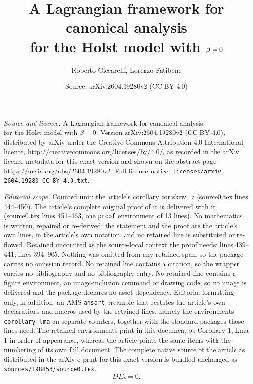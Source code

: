 \documentclass[10pt,a4paper]{amsart}
\title{A Lagrangian framework for canonical analysis \\ for the Holst model with $\be = 0$}
\author{Roberto Ciccarelli, Lorenzo Fatibene}
\date{Source: arXiv:2604.19280v2 (CC BY 4.0)}
\def\be{\beta}
\begin{document}
\maketitle

\noindent\emph{Source and licence.} A Lagrangian framework for canonical analysis \\ for the Holst model with $\be = 0$. Version arXiv:2604.19280v2 (CC BY 4.0), distributed by arXiv under the Creative Commons Attribution 4.0 International licence, http://creativecommons.org/licenses/by/4.0/, as recorded in the arXiv licence metadata for this exact version and shown on the abstract page https://arxiv.org/abs/2604.19280v2. Full licence notice: \texttt{licenses/arxiv-2604.19280-CC-BY-4.0.txt}.\par\smallskip

\noindent\textit{Editorial scope.} Counted unit: the article's corollary cor:skew\_z (source0.tex lines 444--450). The article's complete original proof of it is delivered with it (source0.tex lines 451--463, one \texttt{proof} environment of 13 lines). No mathematics is written, repaired or re-derived: the statement and the proof are the article's own lines, in the article's own notation, and no retained line is substituted or re-flowed.  Retained uncounted as the source-local context the proof needs: lines 439--441; lines 894--905.  Nothing was omitted from any retained span, so the package carries no omission record.  No retained line contains a citation, so the wrapper carries no bibliography and no bibliography entry.  No retained line contains a figure environment, an image-inclusion command or drawing code, so no image is delivered and the package declares no asset dependency.  Editorial formatting only, in addition: an AMS \texttt{amsart} preamble that restates the article's own declarations and macros used by the retained lines, namely the environments \texttt{corollary}, \texttt{lma} on separate counters, together with the standard packages those lines need.  The retained environments print in this document as Corollary 1, Lma 1 in order of appearance, whereas the article prints the same items with the numbering of its own full document.  The complete native source of the article as distributed in the arXiv e-print for this exact version is bundled unchanged as \texttt{sources/198853/source0.tex}.
\begin{equation}
    \boxed{D E_k = 0}  \label{eq:gauss_constraint}.
\end{equation}
\end{document}
